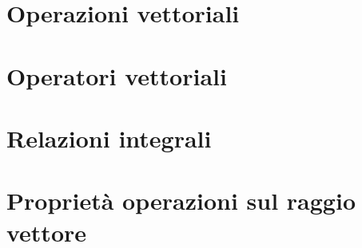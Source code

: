 \section{Operazioni vettoriali}


\section{Operatori vettoriali}


\section{Relazioni integrali}


\section{Proprietà operazioni sul raggio vettore}

